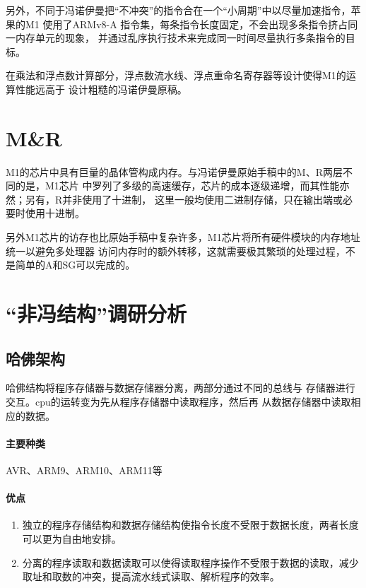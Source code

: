 \documentclass[UTF8]{ctexart}
\begin{document}
另外，不同于冯诺伊曼把“不冲突”的指令合在一个“小周期”中以尽量加速指令，苹果的M1
使用了ARMv8-A 指令集，每条指令长度固定，不会出现多条指令挤占同一内存单元的现象，
并通过乱序执行技术来完成同一时间尽量执行多条指令的目标。

在乘法和浮点数计算部分，浮点数流水线、浮点重命名寄存器等设计使得M1的运算性能远高于
设计粗糙的冯诺伊曼原稿。

\section{M\&R}

M1的芯片中具有巨量的晶体管构成内存。与冯诺伊曼原始手稿中的M、R两层不同的是，M1芯片
中罗列了多级的高速缓存，芯片的成本逐级递增，而其性能亦然；另有，R并非使用了十进制，
这里一般均使用二进制存储，只在输出端或必要时使用十进制。

另外M1芯片的访存也比原始手稿中复杂许多，M1芯片将所有硬件模块的内存地址统一以避免多处理器
访问内存时的额外转移，这就需要极其繁琐的处理过程，不是简单的A和SG可以完成的。

\section{“非冯结构”调研分析}

\subsection{哈佛架构}

哈佛结构将程序存储器与数据存储器分离，两部分通过不同的总线与
存储器进行交互。cpu的运转变为先从程序存储器中读取程序，然后再
从数据存储器中读取相应的数据。

\paragraph*{主要种类}

AVR、ARM9、ARM10、ARM11等

\paragraph*{优点}

\begin{enumerate}
    \item 独立的程序存储结构和数据存储结构使指令长度不受限于数据长度，两者长度可以更为自由地安排。
    \item 分离的程序读取和数据读取可以使得读取程序操作不受限于数据的读取，减少取址和取数的冲突，提高流水线式读取、解析程序的效率。
\end{enumerate}
\end{document}
